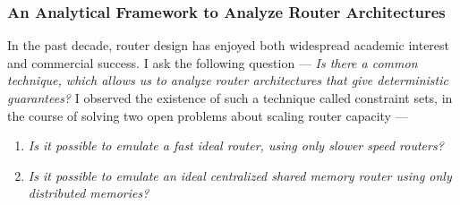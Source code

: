 \documentclass[a4paper, 12pt]{article}
\begin{document}
\begin{small}



\subsubsection*{\small An Analytical Framework to Analyze Router Architectures}



In the past decade, router design has enjoyed both widespread academic interest and
commercial success. I ask the following question --- {\em Is there a common
technique, which allows us to analyze router architectures that give deterministic
guarantees?}
I observed the existence of such a technique called constraint sets, in the course of solving
two open problems about scaling router capacity ---

\begin{enumerate}

\item {\em Is it possible to emulate a fast ideal router, using only slower speed routers?}

\item {\em Is it possible to emulate an ideal centralized shared memory router using only distributed memories?}

\end{enumerate}



\end{small}
\end{document}
